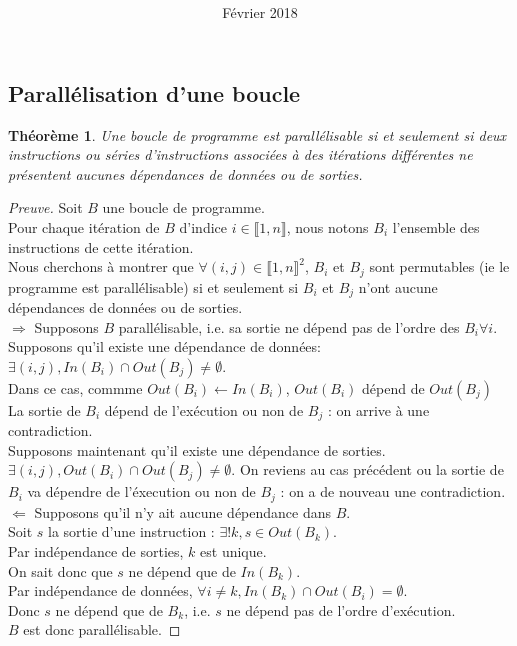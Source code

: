 \documentclass{article}
\title{
\LARGE{\textbf{\hmwkClass}}\\
\vspace{0.5in}
\large{\textbf{\hmwkTitle}}
\vspace{3in}
}
\author{\textbf{\hmwkAuthorName}}
\date{Février 2018} %
\newtheorem*{theorem}{Théorème}
\begin{document}
\maketitle

\newpage

\subsection*{Parallélisation d'une boucle}


\begin{theorem}
Une boucle de programme est parallélisable si et seulement si deux instructions ou séries d'instructions associées à des itérations différentes ne présentent aucunes dépendances de données ou de sorties.
\end{theorem}

\begin{proof}[Preuve]
Soit $B$ une boucle de programme.\\
Pour chaque itération de $B$ d'indice $i \in \llbracket 1,n \rrbracket$, nous notons $B_i$ l'ensemble des instructions de cette itération.\\

Nous cherchons à montrer que $\forall (i,j) \in \llbracket 1,n \rrbracket^2$, $B_i$ et $B_j$ sont permutables (ie le programme est parallélisable) si et seulement si $B_i$ et $B_j$ n'ont aucune dépendances de données ou de sorties.\\

$\Rightarrow$ Supposons $B$ parallélisable, i.e. sa sortie ne dépend pas de l'ordre des $B_i \forall i$.\\

Supposons qu'il existe une dépendance de données: $\exists (i,j), In(B_i) \cap Out(B_j) \neq \emptyset$.\\

Dans ce cas, commme $Out(B_i) \gets In(B_i)$, $Out(B_i)$ dépend de $Out(B_j)$
La sortie de $B_i$ dépend de l'exécution ou non de $B_j$ : on arrive à une contradiction.\\

Supposons maintenant qu'il existe une dépendance de sorties. $\exists (i,j), Out(B_i) \cap Out(B_j) \neq \emptyset$.
On reviens au cas précédent ou la sortie de $B_i$ va dépendre de l'éxecution ou non de $B_j$ : on a de nouveau une contradiction.\\

$\Leftarrow$ Supposons qu'il n'y ait aucune dépendance dans $B$.\\
Soit $s$ la sortie d'une instruction : $\exists! k, s \in Out(B_k)$.\\

Par indépendance de sorties, $k$ est unique.\\
On sait donc que $s$ ne dépend que de $In(B_k)$.\\

Par indépendance de données, $\forall i \neq k, In(B_k) \cap Out(B_i) = \emptyset$.\\
Donc $s$ ne dépend que de $B_k$, i.e. $s$ ne dépend pas de l'ordre d'exécution.\\

$B$ est donc parallélisable.
\end{proof}
\end{document}
